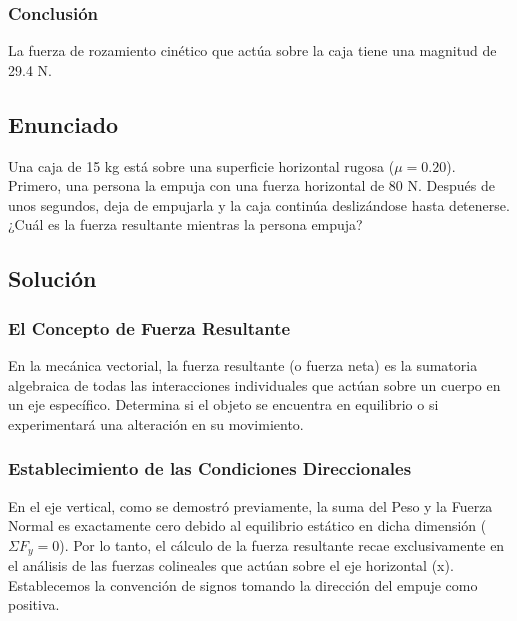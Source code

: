 \documentclass[12pt]{article}
\begin{document}
\subsubsection*{Conclusión}
La fuerza de rozamiento cinético que actúa sobre la caja tiene una magnitud de 29.4 N.

\newpage

\subsection*{Enunciado}
Una caja de 15 kg está sobre una superficie horizontal rugosa ($\mu = 0.20$). Primero, una persona la empuja con una fuerza horizontal de 80 N. Después de unos segundos, deja de empujarla y la caja continúa deslizándose hasta detenerse. ¿Cuál es la fuerza resultante mientras la persona empuja?

\subsection*{Solución}

\subsubsection*{El Concepto de Fuerza Resultante}
En la mecánica vectorial, la fuerza resultante (o fuerza neta) es la sumatoria algebraica de todas las interacciones individuales que actúan sobre un cuerpo en un eje específico. Determina si el objeto se encuentra en equilibrio o si experimentará una alteración en su movimiento. 

\subsubsection*{Establecimiento de las Condiciones Direccionales}
En el eje vertical, como se demostró previamente, la suma del Peso y la Fuerza Normal es exactamente cero debido al equilibrio estático en dicha dimensión ($\Sigma F_y = 0$). Por lo tanto, el cálculo de la fuerza resultante recae exclusivamente en el análisis de las fuerzas colineales que actúan sobre el eje horizontal (x). Establecemos la convención de signos tomando la dirección del empuje como positiva.
\end{document}
